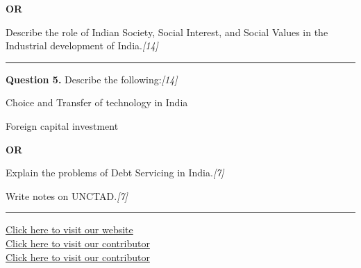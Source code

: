 \documentclass[11pt,a4paper]{article}
\newcommand{\pts}[1]{\hfill   \textit{[#1]}}
\begin{document}
\centerline{   \textbf{OR}}

Describe the role of Indian Society, Social Interest, and Social Values in the Industrial development of India.\pts{14}

\medskip\rule{\linewidth}{0.2pt}




\noindent   \textbf{Question 5.}
Describe the following:\pts{14}

\begin{parts}
  \item Choice and Transfer of technology in India
  \item Foreign capital investment
\end{parts}

\centerline{   \textbf{OR}}


\begin{parts}
  \item Explain the problems of Debt Servicing in India.\pts{7}
  \item Write notes on UNCTAD.\pts{7}
\end{parts}

\vfill
\rule{\linewidth}{0.4pt}

\begin{center}\small
\href{https://bhu-exam.vercel.app/}{Click here to visit our website}\\[4pt]
\href{https://me-aryan.vercel.app/}{Click here to visit our contributor}\\[4pt]
\href{https://quashan-me.vercel.app/}{Click here to visit our contributor}
\end{center}
\end{document}
